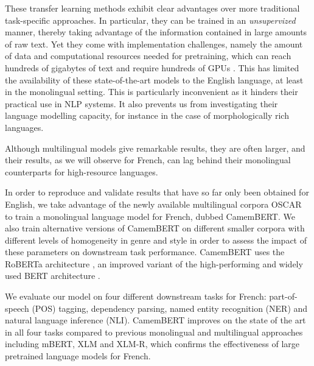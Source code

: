 \documentclass[11pt,a4paper]{article}
\newcommand{\camembert}{CamemBERT\xspace}
\newcommand{\roberta}{RoBERTa\xspace}
\newcommand{\bert}{BERT\xspace}
\newcommand{\mbert}{mBERT\xspace}
\begin{document}
These transfer learning methods exhibit clear advantages over more traditional task-specific approaches. In particular, they can be trained in an \emph{unsupervized} manner, thereby taking advantage of the information contained in large amounts of raw text.
Yet they come with implementation challenges, namely the amount of data and computational resources needed for pretraining, which can reach hundreds of gigabytes of text and require hundreds of GPUs \cite{yang2019xlnet,liu2019roberta}.
This has limited the availability of these state-of-the-art models to the English language, at least in the monolingual setting.
This is particularly inconvenient as it hinders their practical use in NLP systems. It also prevents us from investigating their language modelling capacity, for instance in the case of morphologically rich languages.

Although multilingual models give remarkable results, they are often larger, and their results, as we will observe for French, can lag behind their monolingual counterparts for high-resource languages. 

In order to reproduce and validate results that have so far only been obtained for English, we take advantage of the newly available multilingual corpora OSCAR \cite{ortiz2019asynchronous} to train a monolingual language model for French, dubbed \camembert. We also train alternative versions of \camembert on different smaller corpora with different levels of homogeneity in genre and style in order to assess the impact of these parameters on downstream task performance.
\camembert uses the \roberta architecture \cite{liu2019roberta}, an improved variant of the high-performing and widely used \bert architecture \cite{devlin2019bert}.

We evaluate our model on four different downstream tasks for French: part-of-speech (POS) tagging, dependency parsing, named entity recognition (NER) and natural language inference (NLI).
\camembert improves on the state of the art in all four tasks compared to previous monolingual and multilingual approaches including \mbert, XLM and XLM-R, which confirms the effectiveness of large pretrained language models for French.
\end{document}
